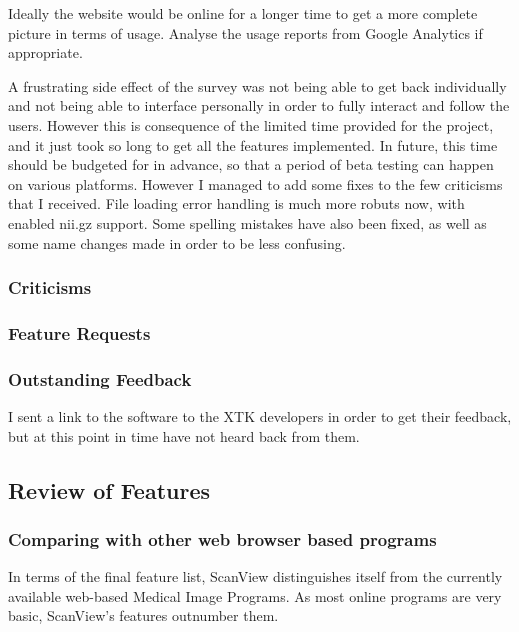 \documentclass[a4paper,11pt,titlepage]{article}
\begin{document}
Ideally the website would be online for a longer time to get a more complete picture in terms of usage.
Analyse the usage reports from Google Analytics if appropriate.

A frustrating side effect of the survey
was not being able to get back individually and not being able to interface personally in order to fully interact and follow the users. However this is consequence of the limited time provided for the project, and it just took so long to get all the features implemented. In future, this time should be budgeted for in advance, so that a period of beta testing can happen on various platforms.
However I managed to add some fixes to the few criticisms that I received. File loading error handling is much more robuts now, with enabled nii.gz support. Some spelling mistakes have also been fixed, as well as some name changes made in order to be less confusing.

\subsubsection{Criticisms}


\subsubsection{Feature Requests}


\subsubsection{Outstanding Feedback}

I sent a link to the software to the XTK developers in order to get their feedback, but at this point in time have not heard back from them.



\subsection{Review of Features}

\subsubsection{Comparing with other web browser based programs}

In terms of the final feature list, ScanView distinguishes itself from the currently available web-based Medical Image Programs. As most online programs are very basic, ScanView's features outnumber them. 
\end{document}
